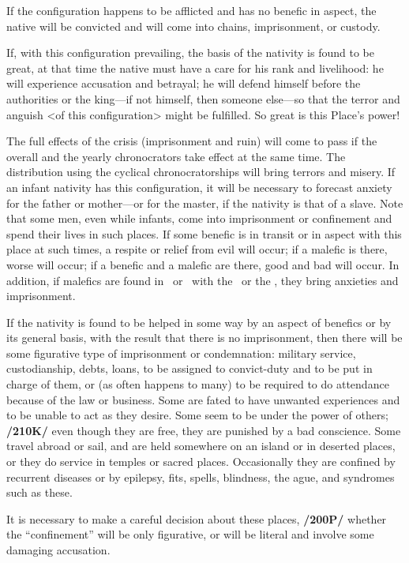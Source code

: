 If the configuration happens to be afflicted and has no benefic in aspect, the native will be convicted and will come into chains,
imprisonment, or custody. 

If, with this configuration prevailing, the basis of the nativity is found to be great, at that time the native must have a care for his rank and livelihood: he will experience accusation and betrayal; he will defend himself before the authorities or the king—if not himself, then someone else—so that the terror and anguish <of this configuration> might be fulfilled. So great is this Place’s power!

The full effects of the crisis (imprisonment and ruin) will come to pass if the overall and the yearly chronocrators take effect at the same time. The distribution using the cyclical chronocratorships will bring terrors and misery. If an infant nativity has this configuration, it will be necessary to forecast anxiety for the father or mother—or for the master, if the nativity is that of a slave. Note that some men, even while infants, come into imprisonment or confinement and spend their lives in such places. If some benefic is in transit or in aspect with this place at such times, a respite or relief from evil will occur; if a malefic is there, worse will occur; if a benefic and a malefic are there, good and bad will occur. In addition, if malefics are found in \Opposition\, or \Square\, with the \Sun\, or the \Moon, they bring anxieties and imprisonment.

If the nativity is found to be helped in some way by an aspect of benefics or by its general basis, with the result that there is no imprisonment, then there will be some figurative type of imprisonment or condemnation: military service, custodianship, debts, loans, to be assigned to convict-duty and to be put in charge of them, or (as often happens to many) to be required to do attendance because of the law or business. Some are fated to have unwanted experiences and to be unable to act as they desire. Some seem to be under the power of others; \textbf{/210K/} even though they are free, they are punished by a bad conscience. Some travel abroad or sail, and are held somewhere on an island or in deserted places, or they do service in temples or sacred places. Occasionally they are confined by recurrent diseases or by epilepsy, fits, spells, blindness, the ague, and syndromes such as these. 

It is necessary to make a careful decision about these places, \textbf{/200P/} whether the “confinement” will be only figurative, or will be literal and involve some damaging accusation.

